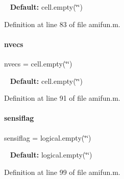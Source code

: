 ~\newline
{\bfseries{Default\+:}} cell.\+empty(\char`\"{}\char`\"{}) 

Definition at line 83 of file amifun.\+m.

\mbox{\label{classamifun_a019d960f3d1c1c819a7f3fc90f952c4b}} 
\paragraph{\texorpdfstring{nvecs}{nvecs}}
{\footnotesize\ttfamily nvecs = cell.\+empty(\char`\"{}\char`\"{})}

~\newline
{\bfseries{Default\+:}} cell.\+empty(\char`\"{}\char`\"{}) 

Definition at line 91 of file amifun.\+m.

\mbox{\label{classamifun_ad8930a02bca1d5facc6203b722d5349d}} 
\paragraph{\texorpdfstring{sensiflag}{sensiflag}}
{\footnotesize\ttfamily sensiflag = logical.\+empty(\char`\"{}\char`\"{})}

~\newline
{\bfseries{Default\+:}} logical.\+empty(\char`\"{}\char`\"{}) 

Definition at line 99 of file amifun.\+m.

